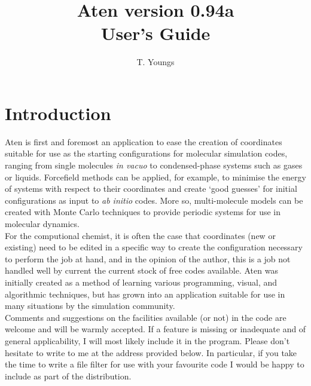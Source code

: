 \documentclass[a4paper,10pt]{report}
\begin{document}
\newenvironment{optlist}[1]
  {
    \begin{flushleft}\textbf{#1}\end{flushleft}
    \begin{list}{}{}
  }
  { \end{list} }

\newcommand{\progname}{{\sffamily Aten}}
\newcommand{\qte}[1]{\lq{}#1\rq{}}
\newcommand{\ttqte}[1]{\lq{}{\ttfamily#1}\rq{}}
\newcommand{\dqte}[1]{``#1''}
\newcommand{\its}{\hspace{20cm}}

\title{\progname{} version 0.94a \\ User's Guide}
\author{T. Youngs}
\maketitle

\tableofcontents

\clearpage

\section{Introduction}

\progname{} is first and foremost an application to ease the creation of coordinates suitable for use as the starting configurations for molecular simulation codes, ranging from single molecules \textit{in vacuo} to condensed-phase systems such as gases or liquids. Forcefield methods can be applied, for example, to minimise the energy of systems with respect to their coordinates and create \qte{good guesses} for initial configurations as input to \textit{ab initio} codes. More so, multi-molecule models can be created with Monte Carlo techniques to provide periodic systems for use in molecular dynamics.\\

For the computional chemist, it is often the case that coordinates (new or existing) need to be edited in a specific way to create the configuration necessary to perform the job at hand, and in the opinion of the author, this is a job not handled well by current the current stock of free codes available. \progname{} was initially created as a method of learning various programming, visual, and algorithmic techniques, but has grown into an application suitable for use in many situations by the simulation community.\\

Comments and suggestions on the facilities available (or not) in the code are welcome and will be warmly accepted. If a feature is missing or inadequate and of general applicability, I will most likely include it in the program. Please don't hesitate to write to me at the address provided below. In particular, if you take the time to write a file filter for use with your favourite code I would be happy to include as part of the distribution.\\
\end{document}
